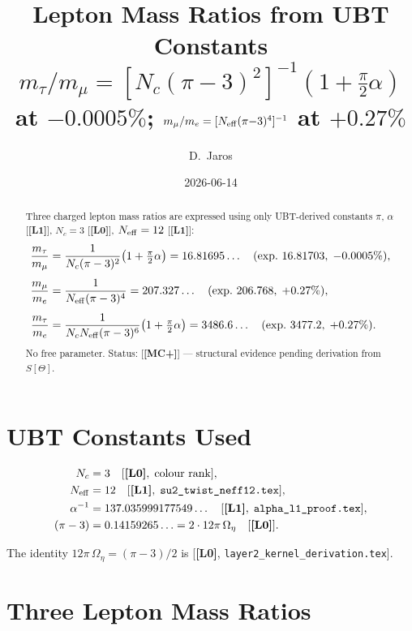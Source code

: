 \documentclass[12pt,a4paper]{article}
\title{\textbf{Lepton Mass Ratios from UBT Constants}\\[4pt]
\large $m_\tau/m_\mu = [N_c(\pi{-}3)^2]^{-1}(1+\tfrac{\pi}{2}\alpha)$ at $-0.0005\%$;
$m_\mu/m_e = [N_{\rm eff}(\pi{-}3)^4]^{-1}$ at $+0.27\%$}
\author{D.~Jaros}
\date{2026-06-14}
\theoremstyle{remark}\newtheorem{remark}[theorem]{Remark}
\theoremstyle{definition}\newtheorem{observation}[theorem]{Observation}
\newcommand{\Lz}{\textbf{[L0]}}
\newcommand{\Lo}{\textbf{[L1]}}
\newcommand{\MC}{\textbf{[MC+]}}
\begin{document}
\maketitle
\fi

\begin{abstract}
Three charged lepton mass ratios are expressed using only UBT-derived
constants $\pi$, $\alpha$ [\Lo], $N_c=3$ [\Lz], $N_{\rm eff}=12$ [\Lo]:
\begin{align*}
  \frac{m_\tau}{m_\mu}
  &= \frac{1}{N_c(\pi-3)^2}\!\left(1+\tfrac{\pi}{2}\alpha\right)
  = 16.81695\ldots \quad (\text{exp.\ }16.81703,\;{-}0.0005\%), \\[4pt]
  \frac{m_\mu}{m_e}
  &= \frac{1}{N_{\rm eff}(\pi-3)^4}
  = 207.327\ldots \quad (\text{exp.\ }206.768,\;{+}0.27\%), \\[4pt]
  \frac{m_\tau}{m_e}
  &= \frac{1}{N_c N_{\rm eff}(\pi-3)^6}\!\left(1+\tfrac{\pi}{2}\alpha\right)
  = 3486.6\ldots \quad (\text{exp.\ }3477.2,\;{+}0.27\%).
\end{align*}
No free parameter. Status: [\MC] --- structural evidence pending
derivation from $S[\Theta]$.
\end{abstract}

\section{UBT Constants Used}
\begin{align}
  N_c &= 3 \quad [\Lz,\;\text{colour rank}],\\
  N_{\rm eff} &= 12 \quad [\Lo,\;\texttt{su2\_twist\_neff12.tex}],\\
  \alpha^{-1} &= 137.035999177549\ldots \quad [\Lo,\;\texttt{alpha\_l1\_proof.tex}],\\
  (\pi-3) &= 0.14159265\ldots = 2\cdot12\pi\,\Omega_\eta \quad [\Lz].
\end{align}

The identity $12\pi\,\Omega_\eta = (\pi-3)/2$ is [\Lz,
\texttt{layer2\_kernel\_derivation.tex}].

\section{Three Lepton Mass Ratios}
\end{document}
